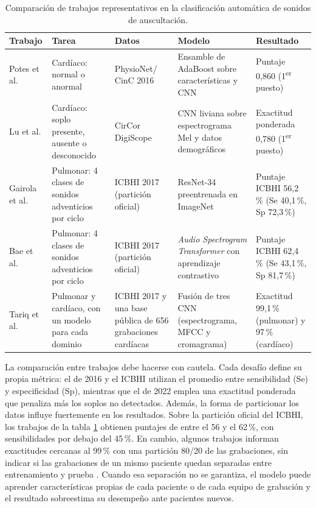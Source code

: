\begin{table}[htbp]
	\centering
	\caption[Comparación de trabajos representativos del estado del arte]{Comparación de
		trabajos representativos en la clasificación automática de sonidos de auscultación.}
	\label{tab:estadoArte}
	\small
	\begin{tabular}{>{\raggedright\arraybackslash}p{2.0cm} >{\raggedright\arraybackslash}p{2.3cm} >{\raggedright\arraybackslash}p{2.3cm} >{\raggedright\arraybackslash}p{2.9cm} >{\raggedright\arraybackslash}p{2.1cm}}
		\toprule
		\textbf{Trabajo} & \textbf{Tarea} & \textbf{Datos} & \textbf{Modelo} & \textbf{Resultado} \\
		\midrule
		Potes et al. & Cardíaco: normal o anormal & PhysioNet/ CinC 2016 & Ensamble de AdaBoost sobre características y CNN & Puntaje 0,860 (1\textsuperscript{er} puesto) \\
		\addlinespace
		Lu et al. & Cardíaco: soplo presente, ausente o desconocido & CirCor DigiScope & CNN liviana sobre espectrograma Mel y datos demográficos & Exactitud ponderada 0,780 (1\textsuperscript{er} puesto) \\
		\addlinespace
		Gairola et al. & Pulmonar: 4 clases de sonidos adventicios por ciclo & ICBHI 2017 (partición oficial) & ResNet-34 preentrenada en ImageNet & Puntaje ICBHI 56,2\,\% (Se 40,1\,\%, Sp 72,3\,\%) \\
		\addlinespace
		Bae et al. & Pulmonar: 4 clases de sonidos adventicios por ciclo & ICBHI 2017 (partición oficial) & \textit{Audio Spectrogram Transformer} con aprendizaje contrastivo & Puntaje ICBHI 62,4\,\% (Se 43,1\,\%, Sp 81,7\,\%) \\
		\addlinespace
		Tariq et al. & Pulmonar y cardíaco, con un modelo para cada dominio & ICBHI 2017 y una base pública de 656 grabaciones cardíacas & Fusión de tres CNN (espectrograma, MFCC y cromagrama) & Exactitud 99,1\,\% (pulmonar) y 97\,\% (cardíaco) \\
		\bottomrule
	\end{tabular}
\end{table}

La comparación entre trabajos debe hacerse con cautela. Cada desafío define su propia métrica: el de
2016 y el ICBHI utilizan el promedio entre sensibilidad (Se) y especificidad (Sp), mientras que el
de 2022 emplea una exactitud ponderada que penaliza más los soplos no detectados. Además, la forma
de particionar los datos influye fuertemente en los resultados. Sobre la partición oficial del
ICBHI, los trabajos de la tabla \ref{tab:estadoArte} obtienen puntajes de entre el 56 y el 62\,\%,
con sensibilidades por debajo del 45\,\%. En cambio, algunos trabajos informan exactitudes cercanas
al 99\,\% con una partición 80/20 de las grabaciones, sin indicar si las grabaciones de un mismo
paciente quedan separadas entre entrenamiento y prueba \citep{tariq2022feature}. Cuando esa
separación no se garantiza, el modelo puede aprender características propias de cada paciente o de
cada equipo de grabación y el resultado sobreestima su desempeño ante pacientes nuevos.

